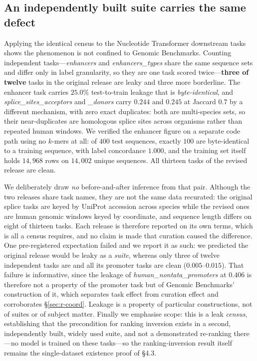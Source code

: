 \subsection{An independently built suite carries the same defect}\label{sec:r-census}
Applying the identical census to the Nucleotide Transformer downstream tasks shows the phenomenon is not confined to Genomic Benchmarks. Counting independent tasks---\textit{enhancers} and \textit{enhancers\_types} share the same sequence sets and differ only in label granularity, so they are one task scored twice---\textbf{three of twelve} tasks in the original release are leaky and three more borderline. The enhancer task carries $25.0\%$ test-to-train leakage that is \emph{byte-identical}, and \textit{splice\_sites\_acceptors} and \textit{\_donors} carry $0.244$ and $0.245$ at Jaccard $0.7$ by a different mechanism, with zero exact duplicates: both are multi-species sets, so their near-duplicates are homologous splice sites across organisms rather than repeated human windows. We verified the enhancer figure on a separate code path using no $k$-mers at all: of $400$ test sequences, exactly $100$ are byte-identical to a training sequence, with label concordance $1.000$, and the training set itself holds $14{,}968$ rows on $14{,}002$ unique sequences. All thirteen tasks of the revised release are clean.

We deliberately draw \emph{no} before-and-after inference from that pair. Although the two releases share task names, they are not the same data recurated: the original splice tasks are keyed by UniProt accession across species while the revised ones are human genomic windows keyed by coordinate, and sequence length differs on eight of thirteen tasks. Each release is therefore reported on its own terms, which is all a census requires, and no claim is made that curation caused the difference. One pre-registered expectation failed and we report it as such: we predicted the original release would be leaky as a \emph{suite}, whereas only three of twelve independent tasks are and all its promoter tasks are clean ($0.005$--$0.015$). That failure is informative, since the leakage of \textit{human\_nontata\_promoters} at $0.406$ is therefore not a property of the promoter task but of Genomic Benchmarks' construction of it, which separates task effect from curation effect and corroborates \S\ref{sec:r-coord}. Leakage is a property of particular constructions, not of suites or of subject matter. Finally we emphasise scope: this is a leak \emph{census}, establishing that the precondition for ranking inversion exists in a second, independently built, widely used suite, and not a demonstrated re-ranking there---no model is trained on these tasks---so the ranking-inversion result itself remains the single-dataset existence proof of \S4.3.

